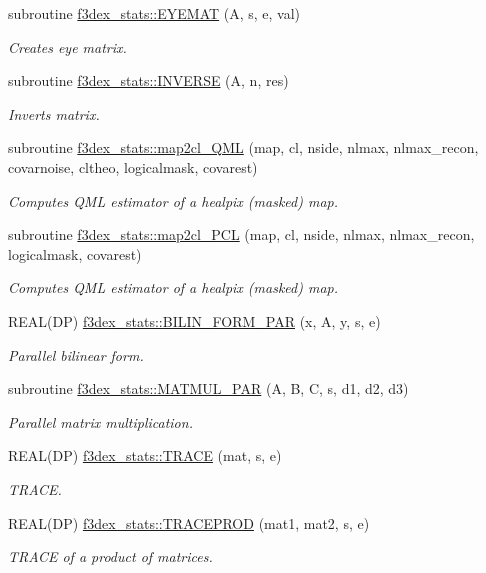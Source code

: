 \begin{DoxyCompactItemize}
\item 
subroutine \hyperlink{namespacef3dex__stats_ae67784686a6f0a1d26c1cef84c250b0d}{f3dex\_\-stats::EYEMAT} (A, s, e, val)
\begin{DoxyCompactList}\small\item\em Creates eye matrix. \end{DoxyCompactList}\item 
subroutine \hyperlink{namespacef3dex__stats_a564304481b43b3d55989683f03460410}{f3dex\_\-stats::INVERSE} (A, n, res)
\begin{DoxyCompactList}\small\item\em Inverts matrix. \end{DoxyCompactList}\item 
subroutine \hyperlink{namespacef3dex__stats_afeef2b0049256649535f458d01e901c8}{f3dex\_\-stats::map2cl\_\-QML} (map, cl, nside, nlmax, nlmax\_\-recon, covarnoise, cltheo, logicalmask, covarest)
\begin{DoxyCompactList}\small\item\em Computes QML estimator of a healpix (masked) map. \end{DoxyCompactList}\item 
subroutine \hyperlink{namespacef3dex__stats_aeff76c576e1699da5b3aa1f4efa4335d}{f3dex\_\-stats::map2cl\_\-PCL} (map, cl, nside, nlmax, nlmax\_\-recon, logicalmask, covarest)
\begin{DoxyCompactList}\small\item\em Computes QML estimator of a healpix (masked) map. \end{DoxyCompactList}\item 
REAL(DP) \hyperlink{namespacef3dex__stats_af0a10f88c8029206196ea18b3ad579ba}{f3dex\_\-stats::BILIN\_\-FORM\_\-PAR} (x, A, y, s, e)
\begin{DoxyCompactList}\small\item\em Parallel bilinear form. \end{DoxyCompactList}\item 
subroutine \hyperlink{namespacef3dex__stats_a046613d05a3a2eb1808a7ee99fba7509}{f3dex\_\-stats::MATMUL\_\-PAR} (A, B, C, s, d1, d2, d3)
\begin{DoxyCompactList}\small\item\em Parallel matrix multiplication. \end{DoxyCompactList}\item 
REAL(DP) \hyperlink{namespacef3dex__stats_aa88d6eefa32a9edc04b3d93af96f5a2e}{f3dex\_\-stats::TRACE} (mat, s, e)
\begin{DoxyCompactList}\small\item\em TRACE. \end{DoxyCompactList}\item 
REAL(DP) \hyperlink{namespacef3dex__stats_ae106140bb309de7d7779b6b086050bf4}{f3dex\_\-stats::TRACEPROD} (mat1, mat2, s, e)
\begin{DoxyCompactList}\small\item\em TRACE of a product of matrices. \end{DoxyCompactList}\end{DoxyCompactItemize}
